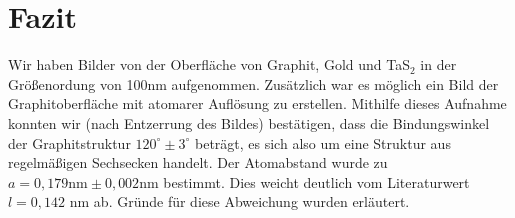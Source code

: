 \section{Fazit}
Wir haben Bilder von der Oberfläche von Graphit, Gold und TaS$_2$ in der Größenordung von 100nm aufgenommen. Zusätzlich war es möglich ein Bild der Graphitoberfläche mit atomarer Auflösung zu erstellen. Mithilfe dieses Aufnahme konnten wir (nach Entzerrung des Bildes) bestätigen, dass die Bindungswinkel der Graphitstruktur $120^\circ \pm 3^\circ$ beträgt, es sich also um eine Struktur aus regelmäßigen Sechsecken handelt. Der Atomabstand wurde zu $a = 0,179\si{\nano\metre} \pm 0,002\si{\nano\metre}$ bestimmt. Dies weicht deutlich vom Literaturwert $l=0,142$ nm ab. Gründe für diese Abweichung wurden erläutert.



